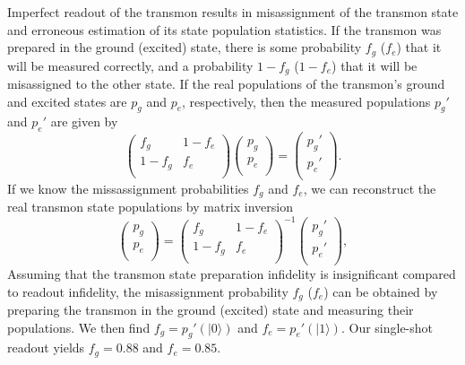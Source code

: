 \documentclass[12pt]{article}
\newcommand{\ket}[1]{\ensuremath{|{#1}\rangle}}
\begin{document}
Imperfect readout of the transmon results in misassignment of the transmon state and erroneous estimation of its state population statistics. If the transmon was prepared in the ground (excited) state, there is some probability $f_g$ ($f_e$) that it will be measured correctly, and a probability $1-f_g$ ($1-f_e$) that it will be misassigned to the other state. If the real populations of the transmon's ground and excited states are $p_g$ and $p_e$, respectively, then the measured populations $p_g'$ and $p_e'$ are given by
\begin{equation}
\begin{pmatrix}
f_g & 1-f_e \\
1-f_g & f_e \\
\end{pmatrix}
\begin{pmatrix}
p_g\\
p_e\\
\end{pmatrix}
=
\begin{pmatrix}
p_g'\\
p_e'\\
\end{pmatrix}.
\end{equation}
If we know the missassignment probabilities $f_g$ and $f_e$, we can reconstruct the real transmon state populations by matrix inversion
\begin{equation}
\begin{pmatrix}
p_g\\
p_e\\
\end{pmatrix}
=
\begin{pmatrix}
f_g & 1-f_e \\
1-f_g & f_e \\
\end{pmatrix}^{-1}
\begin{pmatrix}
p_g'\\
p_e'\\
\end{pmatrix},
\end{equation}
Assuming that the transmon state preparation infidelity is insignificant compared to readout infidelity, the misassignment probability $f_g$ ($f_e$) can be obtained by preparing the transmon in the ground (excited) state and measuring their populations. We then find $f_g = p_g'(\ket{0})$ and $f_e = p_e'(\ket{1})$. Our single-shot readout yields $f_g = 0.88$ and $f_e = 0.85$.
\end{document}
